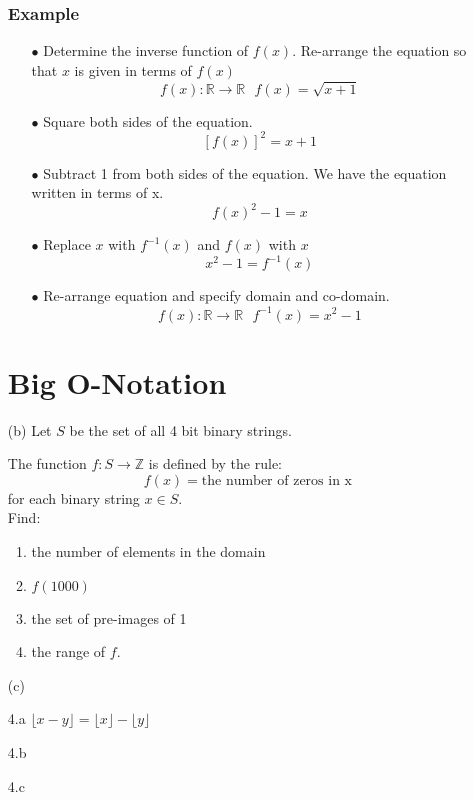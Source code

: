 \documentclass[12pt]{article}
\begin{document}
\begin{itemize}
\subsubsection{Example}
\begin{itemize}
\item[$\bullet$]Determine the inverse function of $f(x)$. Re-arrange the equation so that $x$ is given in terms of $f(x)$
\[  f(x): \mathbb{R} \rightarrow \mathbb{R}  \mbox{   } f(x)  = \sqrt{x+1} \]
\item[$\bullet$] Square both sides of the equation.
\[[f(x)]^2 = x+1 \]
\item[$\bullet$] Subtract 1 from both sides of the equation. We have the equation written in terms of x.
\[f(x)^2-1 = x \]
\item[$\bullet$] Replace $x$ with $f^{-1}(x)$ and $f(x)$ with $x$
\[x^2-1 = f^{-1}(x) \]
\item[$\bullet$] 
 Re-arrange equation and specify domain and co-domain.
\[ f(x): \mathbb{R} \rightarrow \mathbb{R}  \mbox{   }  f^{-1}(x) = x^2-1  \]
\end{itemize}
\newpage
\section{Big O-Notation}


\item[(b)] Let $S$ be the set of all 4 bit binary strings. 

The function $f : S \rightarrow \mathbb{Z}$
is defined by the rule:
\[f(x) = \mbox{the number of zeros in x}\]
for each binary string $x \in S$.\\
Find:
\begin{enumerate}
\item the number of elements in the domain
\item $f(1000)$
\item the set of pre-images of 1
\item the range of $f$.
\end{enumerate}
\item[(c)]
\end{itemize}
\newpage
\begin{itemize}
\item[4.a] $ \lfloor x - y \rfloor = \lfloor x \rfloor - \lfloor y \rfloor$
\item[4.b]
\item[4.c]
\end{itemize}
\newpage
\end{document}
